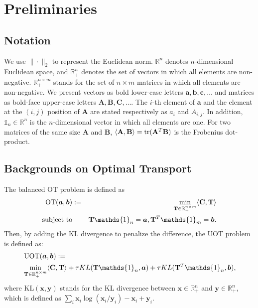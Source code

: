 \documentclass[conference]{IEEEtran}
\newcommand{\R}{\mathbb{R}}
\newcommand{\one}{\mathds{1}}
\newcommand{\mat}[1]{\mathbf{#1}}
\renewcommand{\vec}[1]{\bm{#1}}
\begin{document}
\section{Preliminaries}
\subsection{Notation}
We use $\| \cdot \|_2$ to represent the Euclidean norm. $\mathbb{R}^n$ denotes $n$-dimensional Euclidean space, and $\mathbb{R}^n_+$ denotes the set of vectors in which all elements are non-negative. $\mathbb{R}^{n \times m}_+$ stands for the set of $n \times m$ matrices in which all elements are non-negative. We present vectors as bold lower-case letters $\vec{a},\vec{b},\vec{c},\dots$ and matrices as bold-face upper-case letters $\mat{A},\mat{B},\mat{C},\dots$. The $i$-th element of $\vec{a}$ and the element at the $(i,j)$ position of $\mat{A}$ are stated respectively as $a_i$ and ${A}_{i,j}$. In addition, $\one_n \in \mathbb{R}^n$ is the $n$-dimensional vector in which all elements are one.
For two matrices of the same size $\mat{A}$ and $\mat{B}$, $\langle \mat{A},\mat{B}\rangle={\rm tr}(\mat{A}^T\mat{B})$ is the Frobenius dot-product. 

\subsection{Backgrounds on Optimal Transport}
The balanced OT problem is defined as
\begin{eqnarray}
\label{Eq:Standard_OT}
\operatorname{OT}(\vec{a},\vec{b}) &:=& \min_{ \mat{T} \in \R_{+}^{n \times m}} \langle \mat{C}, \mat{T} \rangle \\
\text{subject\ to}&& \mat{T} \one_n= \vec{a}, \mat{T}^{T}\one_m = \vec{b}. \notag
\end{eqnarray}
Then, by adding the KL divergence to penalize the difference, the UOT problem is defined as:
\begin{align}
\label{eq:uot}
&\operatorname{UOT}(\vec{a},\vec{b}) := \notag\\
&\min_{\mat{T} \in \R_{+}^{n \times m}} \langle \mat{C}, \mat{T} \rangle+ \tau KL(\mat{T} \one_n,\vec{a}) + \tau KL(\mat{T}^{T} \one_n,\vec{b}),
\end{align}
where $\mathrm{KL}(\vec{x},\vec{y})$ stands for the KL divergence between $\vec{x} \in \mathbb{R}_+^n$ and $\vec{y} \in \mathbb{R}_+^n$, which is defined as $\sum_i \vec{x}_i \log {(\vec{x}_i/\vec{y}_i)} - \vec{x}_i + \vec{y}_i$. 
\end{document}
